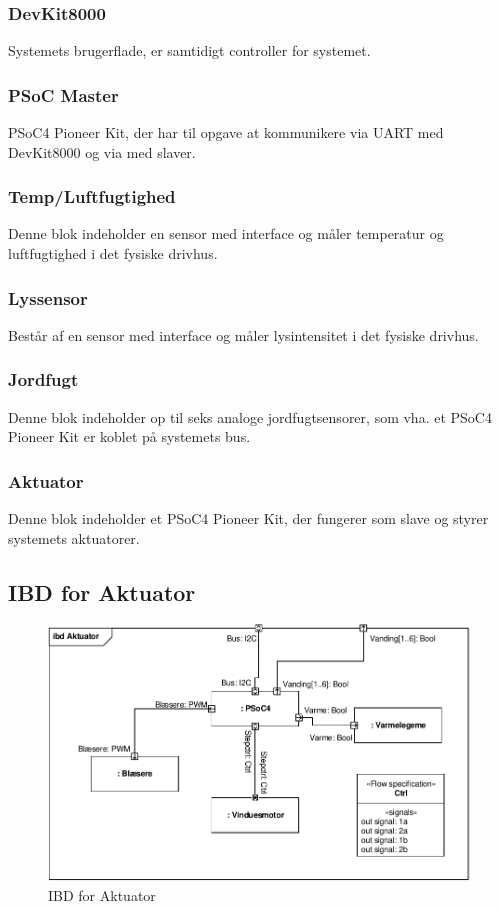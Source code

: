 \subsubsection{DevKit8000}
Systemets brugerflade, er samtidigt controller for systemet. 
\subsubsection{PSoC Master}
PSoC4 Pioneer Kit, der har til opgave at kommunikere via UART med DevKit8000 og via \IIC med slaver.  
\subsubsection{Temp/Luftfugtighed}
Denne blok indeholder en sensor med \IIC interface og måler temperatur og luftfugtighed i det fysiske drivhus.
\subsubsection{Lyssensor}
Består af en sensor med \IIC interface og måler lysintensitet i det fysiske drivhus. 
\subsubsection{Jordfugt}
Denne blok indeholder op til seks analoge jordfugtsensorer, som vha. et PSoC4 Pioneer Kit er koblet på systemets \IIC bus.
\subsubsection{Aktuator}
Denne blok indeholder et PSoC4 Pioneer Kit, der fungerer som \IIC slave og styrer systemets aktuatorer. 

\clearpage

\subsection{IBD for Aktuator}

\begin{figure}[h]
\centering 
\includegraphics[width={\textwidth}, trim=0 0 0 0, clip=true] {../fig/ibd_aktuator.pdf}
\caption{IBD for Aktuator}
\label{fig:ibd_aktuator}
\end{figure}

